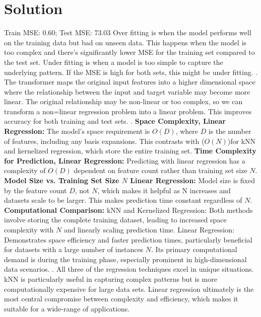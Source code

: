 \documentclass[submit]{harvardml}
\newenvironment{solution}
  {\color{blue}\section*{Solution}}
{}
\begin{document}
\begin{solution}
 Train MSE: 0.60; Test MSE: 73.03
 Over fitting is when the model performs well on the training data but bad on unseen data. This happens when the model is too complex and there's significantly lower MSE for the training set compared to the test set. 
 Under fitting is when a model is too simple to capture the underlying pattern. If the MSE is high for both sets, this might be under fitting. 
 . The transformer maps the original input features into a higher dimensional space where the relationship between the input and target variable may become more linear. The original relationship may be non-linear or too complex, so we can transform a non=linear regression problem into a linear problem. This improves accuracy for both training and test sets. 
 . \textbf{Space Complexity, Linear Regression:} The model's space requirement is $O(D)$, where $D$ is the number of features, including any basis expansions. This contrasts with ($O(N)$)for kNN and kernelized regression, which store the entire training set.  \newline \textbf{Time Complexity for Prediction,
Linear Regression:}  Predicting with linear regression has a complexity of $O(D)$ dependent on feature count rather than training set size $N$. \newline \textbf{Model Size vs. Training Set Size $N$ Linear Regression:} Model size is fixed by the feature count $D$, not $N$, which makes it helpful as N increases and datasets scale to be larger. This makes prediction time constant regardless of $N$. \newline \textbf{Computational Comparison:} \newline kNN and Kernelized Regression: Both methods involve storing the complete training dataset, leading to increased space complexity with $N$ and linearly scaling prediction time. \newline Linear Regression: Demonstrates space efficiency and faster prediction times, particularly beneficial for datasets with a large number of instances $N$. Its primary computational demand is during the training phase, especially prominent in high-dimensional data scenarios.
. All three of the regression techniques excel in unique situations. kNN is particularly useful in capturing complex patterns but is more computationally expensive for large data sets. Linear regression ultimately is the most central compromise between complexity and efficiency, which makes it suitable for a wide-range of applications. 


\newline 


\end{solution}
\end{document}
